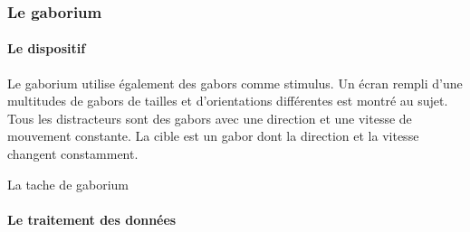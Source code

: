 \subsubsection{Le gaborium}

\paragraph{Le dispositif}Le gaborium utilise également des \glspl{gabor} comme stimulus. Un écran rempli d'une multitudes de gabors de tailles et d'orientations différentes est montré
au sujet. Tous les distracteurs sont des gabors avec une direction et une vitesse de mouvement constante. La cible est un gabor dont la direction et la vitesse changent constamment.


La tache de gaborium


\paragraph{Le traitement des données}



